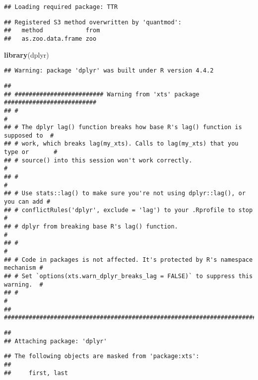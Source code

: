 \documentclass[
]{article}
\newenvironment{Shaded}{\begin{snugshade}}{\end{snugshade}}
\newcommand{\FunctionTok}[1]{\textcolor[rgb]{0.13,0.29,0.53}{\textbf{#1}}}
\newcommand{\NormalTok}[1]{#1}
\begin{document}
\begin{verbatim}
## Loading required package: TTR
\end{verbatim}

\begin{verbatim}
## Registered S3 method overwritten by 'quantmod':
##   method            from
##   as.zoo.data.frame zoo
\end{verbatim}

\begin{Shaded}
\begin{Highlighting}[]
\FunctionTok{library}\NormalTok{(dplyr)}
\end{Highlighting}
\end{Shaded}

\begin{verbatim}
## Warning: package 'dplyr' was built under R version 4.4.2
\end{verbatim}

\begin{verbatim}
## 
## ######################### Warning from 'xts' package ##########################
## #                                                                             #
## # The dplyr lag() function breaks how base R's lag() function is supposed to  #
## # work, which breaks lag(my_xts). Calls to lag(my_xts) that you type or       #
## # source() into this session won't work correctly.                            #
## #                                                                             #
## # Use stats::lag() to make sure you're not using dplyr::lag(), or you can add #
## # conflictRules('dplyr', exclude = 'lag') to your .Rprofile to stop           #
## # dplyr from breaking base R's lag() function.                                #
## #                                                                             #
## # Code in packages is not affected. It's protected by R's namespace mechanism #
## # Set `options(xts.warn_dplyr_breaks_lag = FALSE)` to suppress this warning.  #
## #                                                                             #
## ###############################################################################
\end{verbatim}

\begin{verbatim}
## 
## Attaching package: 'dplyr'
\end{verbatim}

\begin{verbatim}
## The following objects are masked from 'package:xts':
## 
##     first, last
\end{verbatim}
\end{document}
